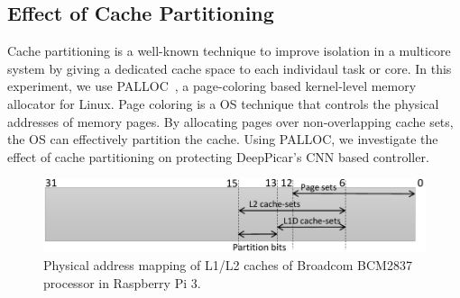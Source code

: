 \subsection{Effect of Cache Partitioning}





Cache partitioning is a well-known technique to improve isolation in
a multicore system by giving a dedicated cache space to each individaul 
task or core. In this experiment, we use PALLOC~\cite{yun2014rtas}, a
page-coloring based kernel-level memory allocator for Linux.
Page coloring is a OS technique that controls the physical addresses
of memory pages. By allocating pages over non-overlapping cache sets,
the OS can effectively partition the cache.
Using PALLOC, we investigate the effect of cache partitioning on
protecting DeepPicar's CNN based controller.

\begin{figure} [h]
  \centering
  \includegraphics[width=.5\textwidth]{figs/cache-mapping}
  \caption{Physical address mapping of L1/L2 caches of Broadcom
    BCM2837 processor in Raspberry Pi 3.}
  \label{fig:cache-mapping}
\end{figure}

